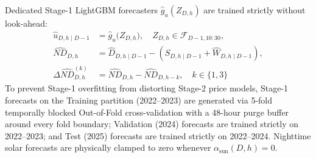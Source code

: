\documentclass[journal,10pt,twocolumn]{IEEEtran}
\begin{document}
Dedicated Stage-1 LightGBM forecasters $\hat{g}_u(Z_{D,h})$ are trained strictly without look-ahead:
\begin{equation}
\begin{aligned}
\hat{u}_{D,h \mid D-1} &= \hat{g}_u\big(Z_{D,h}\big), \quad Z_{D,h} \in \mathcal{F}_{D-1, 10:30}, \\
\widehat{ND}_{D,h} &= \hat{D}_{D,h \mid D-1} - \left(\hat{S}_{D,h \mid D-1} + \hat{W}_{D,h \mid D-1}\right), \\
\Delta \widehat{ND}_{D,h}^{(k)} &= \widehat{ND}_{D,h} - \widehat{ND}_{D,h-k}, \quad k \in \{1, 3\}
\end{aligned}
\label{eq:stage1_recon}
\end{equation}
To prevent Stage-1 overfitting from distorting Stage-2 price models, Stage-1 forecasts on the Training partition (2022--2023) are generated via 5-fold temporally blocked Out-of-Fold cross-validation with a 48-hour purge buffer around every fold boundary; Validation (2024) forecasts are trained strictly on 2022--2023; and Test (2025) forecasts are trained strictly on 2022--2024. Nighttime solar forecasts are physically clamped to zero whenever $\alpha_{\text{sun}}(D,h) = 0$.
\end{document}
